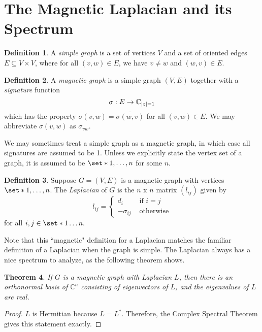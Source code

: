 \documentclass[12pt]{article}
\newtheorem{thm}{Theorem}
\theoremstyle{definition}
\newtheorem{defn}[thm]{Definition}
\newcommand{\C}{\mathbb C}
\DeclarePairedDelimiter\abs{\lvert}{\rvert}%
\begin{document}
\section{The Magnetic Laplacian and its Spectrum}

\begin{defn}
A \textit{simple graph} is a set of vertices $V$ and a set of oriented edges $E \subseteq V \times V$, where for all $(v, w) \in E$, we have $v \neq w$ and $(w, v) \in E$.
\end{defn}

\begin{defn}
A \textit{magnetic graph} is a simple graph $(V, E)$ together with a \textit{signature} function $$\sigma : E \rightarrow \C_{\abs*{z}=1}$$ which has the property $\sigma(v, w) = \overline{\sigma(w,v)}$ for all $(v, w) \in E$. We may abbreviate $\sigma(v, w)$ as $\sigma_{vw}$.
\end{defn}

We may sometimes treat a simple graph as a magnetic graph, in which case all signatures are assumed to be 1. Unless we explicitly state the vertex set of a graph, it is assumed to be $\set*{1, \dots, n}$ for some $n$.

\begin{defn}
Suppose $G=(V, E)$ is a magnetic graph with vertices $\set*{1, \dots, n}$. The \textit{Laplacian} of $G$ is the $n$ x $n$ matrix $(l_{ij})$ given by 
$$
l_{ij} =
\begin{cases}
d_i &\mbox{ if } i=j \\
-\sigma_{ij} &\mbox{ otherwise}
\end{cases}
$$
for all $i, j \in \set*{1 \dots n}.$
\end{defn}

Note that this ``magnetic" definition for a Laplacian matches the familiar definition of a Laplacian when the graph is simple. The Laplacian always has a nice spectrum to analyze, as the following theorem shows.

\begin{thm}\label{spectral thm applied to Laplacian}
If $G$ is a magnetic graph with Laplacian $L$, then there is an orthonormal basis of $\C^n$ consisting of eigenvectors of $L$, and the eigenvalues of $L$ are real.
\end{thm}
\begin{proof}
$L$ is Hermitian because $L = L^*$. Therefore, the Complex Spectral Theorem gives this statement exactly.
\end{proof}
\end{document}
